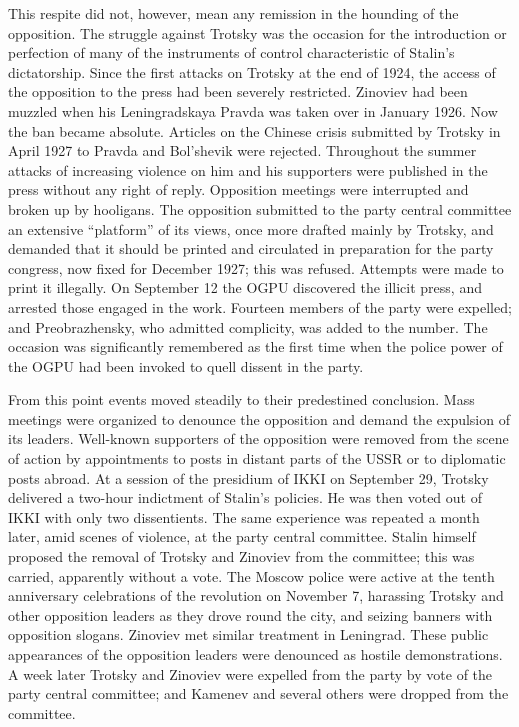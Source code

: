This respite did not, however, mean any remission in the hounding of the opposition. The struggle against Trotsky was the occasion for the introduction or perfection of many of the instruments of control characteristic of Stalin's dictatorship. Since the first attacks on Trotsky at the end of 1924, the access of the opposition to the press had been severely restricted. Zinoviev had been muzzled when his Leningradskaya Pravda was taken over in January 1926. Now the ban became absolute. Articles on the Chinese crisis submitted by Trotsky in April 1927 to Pravda and Bol'shevik were rejected. Throughout the summer attacks of increasing violence on him and his supporters were published in the press without any right of reply. Opposition meetings were interrupted and broken up by hooligans. The opposition submitted to the party central committee an extensive ``platform'' of its views, once more drafted mainly by Trotsky, and demanded that it should be printed and circulated in preparation for the party congress, now fixed for December 1927; this was refused. Attempts were made to print it illegally. On September 12 the OGPU discovered the illicit press, and arrested those engaged in the work. Fourteen members of the party were expelled; and Preobrazhensky, who admitted complicity, was added to the number. The occasion was significantly remembered as the first time when the police power of the OGPU had been invoked to quell dissent in the party. 

From this point events moved steadily to their predestined conclusion. Mass meetings were organized to denounce the opposition and demand the expulsion of its leaders. Well-known supporters of the opposition were removed from the scene of action by appointments to posts in distant parts of the USSR or to diplomatic posts abroad. At a session of the presidium of IKKI on September 29, Trotsky delivered a two-hour indictment of Stalin's policies. He was then voted out of IKKI with only two dissentients. The same experience was repeated a month later, amid scenes of violence, at the party central committee. Stalin himself proposed the removal of Trotsky and Zinoviev from the committee; this was carried, apparently without a vote. The Moscow police were active at the tenth anniversary celebrations of the revolution on November 7, harassing Trotsky and other opposition leaders as they drove round the city, and seizing banners with opposition slogans. Zinoviev met similar treatment in Leningrad. These public appearances of the opposition leaders were denounced as hostile demonstrations. A week later Trotsky and Zinoviev were expelled from the party by vote of the party central committee; and Kamenev and several others were dropped from the committee. 

